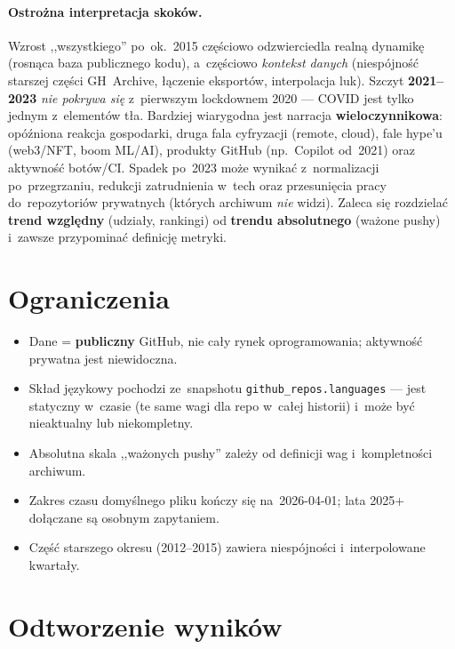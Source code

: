 \documentclass[11pt,a4paper]{article}
\begin{document}
\paragraph{Ostrożna interpretacja skoków.} Wzrost ,,wszystkiego'' po~ok.~2015 częściowo
odzwierciedla realną dynamikę (rosnąca baza publicznego kodu), a~częściowo \emph{kontekst danych}
(niespójność starszej części GH~Archive, łączenie eksportów, interpolacja luk). Szczyt
\textbf{2021--2023} \emph{nie pokrywa się} z~pierwszym lockdownem 2020 --- COVID jest tylko jednym
z~elementów tła. Bardziej wiarygodna jest narracja \textbf{wieloczynnikowa}: opóźniona reakcja
gospodarki, druga fala cyfryzacji (remote, cloud), fale hype'u (web3/NFT, boom ML/AI), produkty
GitHub (np.\ Copilot od~2021) oraz aktywność botów/CI. Spadek po~2023 może wynikać z~normalizacji
po~przegrzaniu, redukcji zatrudnienia w~tech oraz przesunięcia pracy do~repozytoriów prywatnych
(których archiwum \emph{nie} widzi). Zaleca się rozdzielać \textbf{trend względny} (udziały,
rankingi) od \textbf{trendu absolutnego} (ważone pushy) i~zawsze przypominać definicję metryki.

\section{Ograniczenia}

\begin{itemize}[nosep]
  \item Dane = \textbf{publiczny} GitHub, nie cały rynek oprogramowania; aktywność prywatna jest niewidoczna.
  \item Skład językowy pochodzi ze~snapshotu \texttt{github\_repos.languages} --- jest statyczny w~czasie (te same wagi dla repo w~całej historii) i~może być nieaktualny lub niekompletny.
  \item Absolutna skala ,,ważonych pushy'' zależy od definicji wag i~kompletności archiwum.
  \item Zakres czasu domyślnego pliku kończy się na~2026-04-01; lata 2025+ dołączane są osobnym zapytaniem.
  \item Część starszego okresu (2012--2015) zawiera niespójności i~interpolowane kwartały.
\end{itemize}

\section{Odtworzenie wyników}
\end{document}
